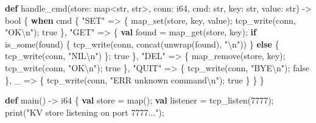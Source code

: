 \documentclass[
  english,
]{book}
\newenvironment{Shaded}{\begin{snugshade}}{\end{snugshade}}
\newcommand{\ConstantTok}[1]{\textcolor[rgb]{0.31,0.76,1.00}{#1}}
\newcommand{\ControlFlowTok}[1]{\textcolor[rgb]{0.77,0.53,0.75}{\textbf{#1}}}
\newcommand{\DataTypeTok}[1]{\textcolor[rgb]{0.31,0.79,0.69}{#1}}
\newcommand{\DecValTok}[1]{\textcolor[rgb]{0.71,0.81,0.66}{#1}}
\newcommand{\FunctionTok}[1]{\textcolor[rgb]{0.86,0.86,0.67}{#1}}
\newcommand{\KeywordTok}[1]{\textcolor[rgb]{0.34,0.61,0.84}{\textbf{#1}}}
\newcommand{\NormalTok}[1]{\textcolor[rgb]{0.83,0.83,0.83}{#1}}
\newcommand{\OperatorTok}[1]{\textcolor[rgb]{0.83,0.83,0.83}{#1}}
\newcommand{\StringTok}[1]{\textcolor[rgb]{0.81,0.57,0.47}{#1}}
\begin{document}
\begin{Shaded}
\begin{Highlighting}[]
\KeywordTok{def}\NormalTok{ handle\_cmd(store: }\DataTypeTok{map}\OperatorTok{\textless{}}\DataTypeTok{str}\NormalTok{, }\DataTypeTok{str}\OperatorTok{\textgreater{}}\NormalTok{, conn: }\DataTypeTok{i64}\NormalTok{, cmd: }\DataTypeTok{str}\NormalTok{, key: }\DataTypeTok{str}\NormalTok{, value: }\DataTypeTok{str}\NormalTok{) }\OperatorTok{{-}\textgreater{}} \DataTypeTok{bool}\NormalTok{ \{}
    \ControlFlowTok{when}\NormalTok{ cmd \{}
        \StringTok{"SET"} \OperatorTok{=\textgreater{}}\NormalTok{ \{}
            \FunctionTok{map\_set}\NormalTok{(store, key, value);}
            \FunctionTok{tcp\_write}\NormalTok{(conn, }\StringTok{"OK\textbackslash{}n"}\NormalTok{);}
            \ConstantTok{true}
\NormalTok{        \},}
        \StringTok{"GET"} \OperatorTok{=\textgreater{}}\NormalTok{ \{}
            \KeywordTok{val}\NormalTok{ found }\OperatorTok{=} \FunctionTok{map\_get}\NormalTok{(store, key);}
            \ControlFlowTok{if} \FunctionTok{is\_some}\NormalTok{(found) \{}
                \FunctionTok{tcp\_write}\NormalTok{(conn, }\FunctionTok{concat}\NormalTok{(unwrap(found), }\StringTok{"\textbackslash{}n"}\NormalTok{))}
\NormalTok{            \} }\ControlFlowTok{else}\NormalTok{ \{}
                \FunctionTok{tcp\_write}\NormalTok{(conn, }\StringTok{"NIL\textbackslash{}n"}\NormalTok{)}
\NormalTok{            \};}
            \ConstantTok{true}
\NormalTok{        \},}
        \StringTok{"DEL"} \OperatorTok{=\textgreater{}}\NormalTok{ \{}
\NormalTok{            map\_remove(store, key);}
            \FunctionTok{tcp\_write}\NormalTok{(conn, }\StringTok{"OK\textbackslash{}n"}\NormalTok{);}
            \ConstantTok{true}
\NormalTok{        \},}
        \StringTok{"QUIT"} \OperatorTok{=\textgreater{}}\NormalTok{ \{}
            \FunctionTok{tcp\_write}\NormalTok{(conn, }\StringTok{"BYE\textbackslash{}n"}\NormalTok{);}
            \ConstantTok{false}
\NormalTok{        \},}
\NormalTok{        \_ }\OperatorTok{=\textgreater{}}\NormalTok{ \{}
            \FunctionTok{tcp\_write}\NormalTok{(conn, }\StringTok{"ERR unknown command\textbackslash{}n"}\NormalTok{);}
            \ConstantTok{true}
\NormalTok{        \}}
\NormalTok{    \}}
\NormalTok{\}}

\KeywordTok{def}\NormalTok{ main() }\OperatorTok{{-}\textgreater{}} \DataTypeTok{i64}\NormalTok{ \{}
    \KeywordTok{val}\NormalTok{ store }\OperatorTok{=} \DataTypeTok{map}\NormalTok{();}
    \KeywordTok{val}\NormalTok{ listener }\OperatorTok{=} \FunctionTok{tcp\_listen}\NormalTok{(}\DecValTok{7777}\NormalTok{);}
    \FunctionTok{print}\NormalTok{(}\StringTok{"KV store listening on port 7777..."}\NormalTok{);}


\end{Highlighting}
\end{Shaded}
\end{document}
